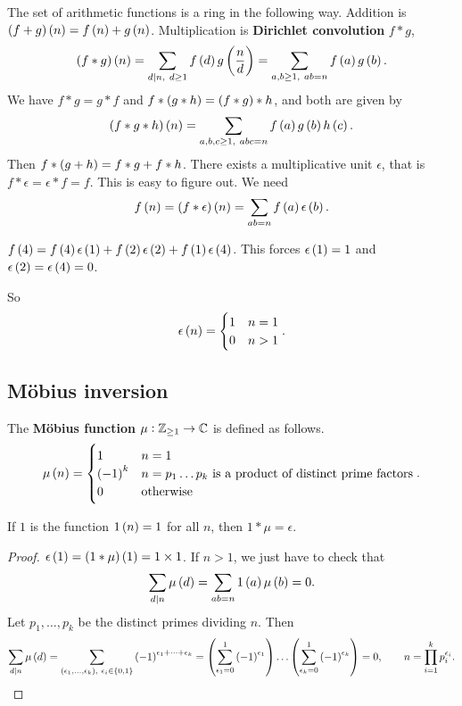The set of arithmetic functions is a ring in the following way. Addition is $ \br{f + g}\br{n} = f\br{n} + g\br{n} $. Multiplication is \textbf{Dirichlet convolution} $ f * g $,
$$ \br{f * g}\br{n} = \sum_{d \mid n, \ d \ge 1} f\br{d}g\br{\dfrac{n}{d}} = \sum_{a, b \ge 1, \ ab = n} f\br{a}g\br{b}. $$
We have $ f * g = g * f $ and $ f * \br{g * h} = \br{f * g} * h $, and both are given by
$$ \br{f * g * h}\br{n} = \sum_{a, b, c \ge 1, \ abc = n} f\br{a}g\br{b}h\br{c}. $$
Then $ f * \br{g + h} = f * g + f * h $. There exists a multiplicative unit $ \epsilon $, that is $ f * \epsilon = \epsilon * f = f $. This is easy to figure out. We need
$$ f\br{n} = \br{f * \epsilon}\br{n} = \sum_{ab = n} f\br{a}\epsilon\br{b}. $$

\begin{example*}
$ f\br{4} = f\br{4}\epsilon\br{1} + f\br{2}\epsilon\br{2} + f\br{1}\epsilon\br{4} $. This forces $ \epsilon\br{1} = 1 $ and $ \epsilon\br{2} = \epsilon\br{4} = 0 $.
\end{example*}

So
$$ \epsilon\br{n} =
\begin{cases}
1 & n = 1 \\
0 & n > 1
\end{cases}.
$$

\subsection{M\"obius inversion}

The \textbf{M\"obius function} $ \mu : \mathbb{Z}_{\ge 1} \to \mathbb{C} $ is defined as follows.
$$ \mu\br{n} =
\begin{cases}
1 & n = 1 \\
\br{-1}^k & n = p_1 \dots p_k \ \text{is a product of distinct prime factors} \\
0 & \text{otherwise}
\end{cases}.
$$

\begin{lemma}
\label{lem:103}
If $ 1 $ is the function $ 1\br{n} = 1 $ for all $ n $, then $ 1 * \mu = \epsilon $.
\end{lemma}

\begin{proof}
$ \epsilon\br{1} = \br{1 * \mu}\br{1} = 1 \times 1 $. If $ n > 1 $, we just have to check that
$$ \sum_{d \mid n} \mu\br{d} = \sum_{ab = n} 1\br{a}\mu\br{b} = 0. $$
Let $ p_1, \dots, p_k $ be the distinct primes dividing $ n $. Then
$$ \sum_{d \mid n} \mu\br{d} = \sum_{\br{\epsilon_1, \dots, \epsilon_k}, \ \epsilon_i \in \cbr{0, 1}} \br{-1}^{\epsilon_1 + \dots + \epsilon_k} = \br{\sum_{\epsilon_1 = 0}^1 \br{-1}^{\epsilon_1}} \dots \br{\sum_{\epsilon_k = 0}^1 \br{-1}^{\epsilon_k}} = 0, \qquad n = \prod_{i = 1}^k p_i^{\epsilon_i}. $$
\end{proof}

